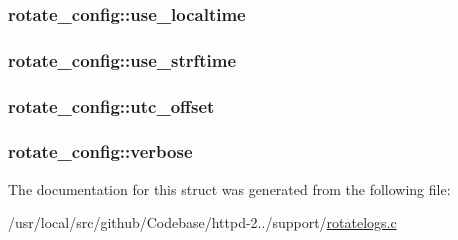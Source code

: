 \subsubsection[{\texorpdfstring{use\+\_\+localtime}{use_localtime}}]{ rotate\+\_\+config\+::use\+\_\+localtime}\hypertarget{structrotate__config_a0a19006aff1fd73c76ba9afe93323b47}{}\label{structrotate__config_a0a19006aff1fd73c76ba9afe93323b47}
\subsubsection[{\texorpdfstring{use\+\_\+strftime}{use_strftime}}]{ rotate\+\_\+config\+::use\+\_\+strftime}\hypertarget{structrotate__config_aa722a6560c1e0a5f1056be971d28be6e}{}\label{structrotate__config_aa722a6560c1e0a5f1056be971d28be6e}
\subsubsection[{\texorpdfstring{utc\+\_\+offset}{utc_offset}}]{ rotate\+\_\+config\+::utc\+\_\+offset}\hypertarget{structrotate__config_a52ab8b2e09ddd9c9dfe2f5bc22e870ee}{}\label{structrotate__config_a52ab8b2e09ddd9c9dfe2f5bc22e870ee}
\subsubsection[{\texorpdfstring{verbose}{verbose}}]{ rotate\+\_\+config\+::verbose}\hypertarget{structrotate__config_a91abcd272d57fd42a78cf5ee99c15e14}{}\label{structrotate__config_a91abcd272d57fd42a78cf5ee99c15e14}


The documentation for this struct was generated from the following file\+:\begin{DoxyCompactItemize}
\item 
/usr/local/src/github/\+Codebase/httpd-\/2../support/\hyperlink{rotatelogs_8c}{rotatelogs.\+c}\end{DoxyCompactItemize}
